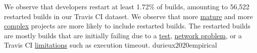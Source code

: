 \documentclass{article}
\begin{document}


  {We observe that developers restart at least 1.72\% of builds, amounting to 56,522 restarted builds in our Travis CI dataset. We observe that more \ul{mature} and more \ul{complex} projects are more likely to include restarted builds. The restarted builds are mostly builds that are initially failing due to a \ul{test}, \ul{network problem}, or a Travis CI \ul{limitations} such as execution timeout.}
  {durieux2020empirical}




\end{document}

